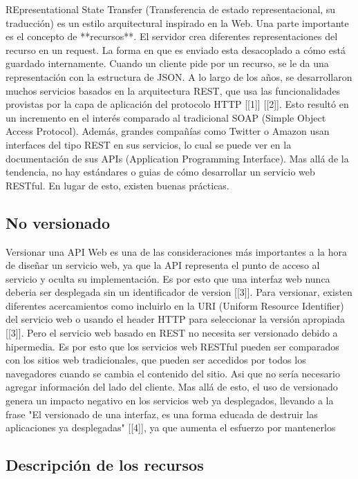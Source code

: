REpresentational State Transfer (Transferencia de estado representacional, su traducción) es un estilo arquitectural inspirado en la Web. 
Una parte importante es el concepto de **recursos**. 
El servidor crea diferentes representaciones del recurso en un request. La forma en que es enviado esta desacoplado a cómo está guardado internamente. Cuando un cliente pide por un recurso, se le da una representación con la estructura de JSON.
A lo largo de los años, se desarrollaron muchos servicios basados en la arquitectura REST, que usa las funcionalidades provistas por la capa de aplicación del protocolo HTTP [[1]] [[2]]. Esto resultó en un incremento en el interés comparado al tradicional SOAP (Simple Object Access Protocol). Además, grandes compañías como Twitter o Amazon usan interfaces del tipo REST en sus servicios, lo cual se puede ver en la documentación de sus APIs (Application Programming Interface).
Mas allá de la tendencia, no hay estándares o guias de cómo desarrollar un servicio web RESTful. En lugar de esto, existen buenas prácticas.

\subsection[No versionado]{No versionado}

Versionar una API Web es una de las consideraciones más importantes a la hora de diseñar un servicio web, ya que la API representa el punto de acceso al servicio y oculta su implementación. Es por esto que una interfaz web nunca deberia ser desplegada sin un identificador de version [[3]]. Para versionar, existen diferentes acercamientos como incluirlo en la URI (Uniform Resource Identifier) del servicio web o usando el header HTTP para seleccionar la versión apropiada [[3]]. Pero el servicio web basado en REST no necesita ser versionado debido a hipermedia. Es por esto que los servicios web RESTful pueden ser comparados con los sitios web tradicionales, que pueden ser accedidos por todos los navegadores cuando se cambia el contenido del sitio. Asi que no sería necesario agregar información del lado del cliente.
Mas allá de esto, el uso de versionado genera un impacto negativo en los servicios web ya desplegados, llevando a la frase "El versionado de una interfaz, es una forma educada de destruir las aplicaciones ya desplegadas" [[4]], ya que aumenta el esfuerzo por mantenerlos


\subsection[Descripción de los recursos]{Descripción de los recursos}

